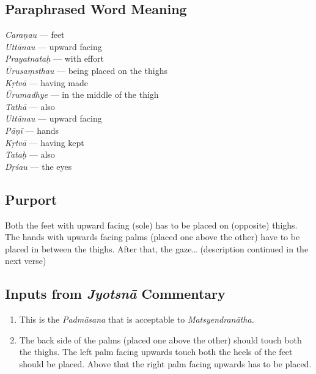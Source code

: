 \subsection*{Paraphrased Word Meaning}


\begin{multicols}{2}
\textit{Caraṇau} --- feet  \\
\textit{Uttānau} --- upward facing  \\
\textit{Prayatnataḥ} --- with effort  \\
\textit{Ūrusaṃsthau} ---  being placed on the thighs  \\
\textit{Kṛtvā} --- having made  \\
\textit{Ūrumadhye} --- in the middle of the thigh  \\
\textit{Tathā} ---  also  \\
\textit{Uttānau} ---  upward facing  \\
\textit{Pāṇī} ---  hands  \\
\textit{Kṛtvā} ---  having kept  \\
\textit{Tataḥ} ---  also  \\
\textit{Dṛśau} --- the eyes
\end{multicols}

\subsection*{Purport}

Both the feet with upward facing (sole) has to be placed on (opposite) thighs. The hands with upwards facing palms (placed one above the other) have to be placed in between the thighs. After that, the gaze… (description continued in the next verse)

\subsection*{Inputs from \textit{Jyotsnā} Commentary}

\begin{enumerate}
\item This is the \textit{Padmāsana} that is acceptable to \textit{Matsyendranātha.}
\item The back side of the palms (placed one above the other) should touch both the thighs. The left palm facing upwards touch both the heels of the feet should be placed. Above that the right palm facing upwards has to be placed.
\end{enumerate}

